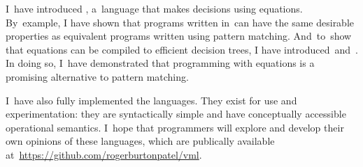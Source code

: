 \documentclass[manuscript,screen 12pt, nonacm]{acmart}
\begin{document}
    I~have introduced \VMinus, a~language that makes decisions using equations.
    By~example, I have shown that
    programs written in~\VMinus can have the same desirable properties
    as equivalent programs written using pattern matching.
    And~to~show that equations can be compiled to efficient decision trees, I have
    introduced~\D and~\DTran.
    In doing so, I~have demonstrated that
    programming with equations is a promising alternative to pattern matching.

    I~have also fully implemented the languages. They exist for use and
    experimentation: they are syntactically simple and have conceptually
    accessible operational semantics. I~hope that programmers will explore and
    develop their own opinions of these languages, which are publically
    available at~\url{https://github.com/rogerburtonpatel/vml}. 

    
    
\end{document}
